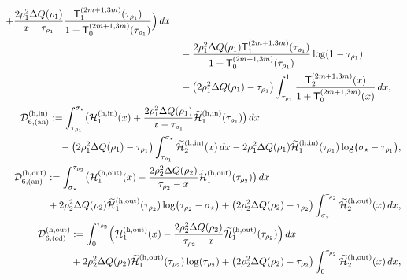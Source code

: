 \documentclass[a4paper]{article}
\numberwithin{equation}{section}
\begin{document}
\begin{align}
\begin{split}
+\frac{2\rho_1^2\Delta Q(\rho_1)}{x-\tau_{\rho_1}}\frac{\mathsf{T}_{1}^{(2m+1,3m)}(\tau_{\rho_1})}{1+\mathsf{T}_{0}^{(2m+1,3m)}(\tau_{\rho_1})}\Bigr)\,dx
\\
&\quad 
-
\frac{2\rho_1^2\Delta Q(\rho_1)\mathsf{T}_{1}^{(2m+1,3m)}(\tau_{\rho_1})}{1+\mathsf{T}_{0}^{(2m+1,3m)}(\tau_{\rho_1})}\log(1-\tau_{\rho_1})
\\
&\quad
-
\bigl(2\rho_1^2\Delta Q(\rho_1)-\tau_{\rho_1}\bigr)
\int_{\tau_{\rho_1}}^{1}
\frac{\mathsf{T}_{2}^{(2m+1,3m)}(x)}{1+\mathsf{T}_{0}^{(2m+1,3m)}(x)}\,dx,
\end{split}
\\
\begin{split}
\mathcal{D}_{6,(\mathrm{an})}^{(\mathrm{h,in})}
&:=
\int_{\tau_{\rho_1}}^{\sigma_{\star}}
\bigl(
\mathcal{H}_1^{(\mathrm{h,in})}(x)
+
\frac{2\rho_1^2\Delta Q(\rho_1)}{x-\tau_{\rho_1}}
\widetilde{\mathcal{H}}_{1}^{(\mathrm{h,in})}(\tau_{\rho_1})
\bigr)\,dx
\\
&\quad
-\bigl(2\rho_1^2\Delta Q(\rho_1)-\tau_{\rho_1}\bigr)
\int_{\tau_{\rho_1}}^{\sigma_{\star}}
\widetilde{\mathcal{H}}_{2}^{(\mathrm{h,in})}(x)\,dx
-
2\rho_1^2\Delta Q(\rho_1)
\widetilde{\mathcal{H}}_{1}^{(\mathrm{h,in})}(\tau_{\rho_1})
\log\bigl(\sigma_{\star}-\tau_{\rho_1}\bigr), 
\end{split}
\\
\begin{split}
\mathcal{D}_{6,(\mathrm{an})}^{(\mathrm{h,out})}
&:=
\int_{\sigma_{\star}}^{\tau_{\rho_2}}
\bigl(
\mathcal{H}_1^{(\mathrm{h,out})}(x)
-
\frac{2\rho_2^2\Delta Q(\rho_2)}{\tau_{\rho_2}-x}
\widetilde{\mathcal{H}}_{1}^{(\mathrm{h,out})}(\tau_{\rho_2})
\bigr)\,dx
\\
&
+
2\rho_2^2\Delta Q(\rho_2)
\widetilde{\mathcal{H}}_{1}^{(\mathrm{h,out})}(\tau_{\rho_2})
\log\bigl(\tau_{\rho_2}-\sigma_{\star}\bigr)
+\bigl( 
2\rho_2^2\Delta Q(\rho_2)-\tau_{\rho_2}
\bigr)\int_{\sigma_{\star}}^{\tau_{\rho_2}}
\widetilde{\mathcal{H}}_{2}^{(\mathrm{h,out})}(x)\,dx, 
\end{split}
\\
\begin{split}
\mathcal{D}_{6,(\mathrm{cd})}^{(\mathrm{h,out})}
&:=
\int_{0}^{\tau_{\rho_2}}
\Bigl(\mathcal{H}_1^{(\mathrm{h,out})}(x)-\frac{2\rho_2^2\Delta Q(\rho_2)}{\tau_{\rho_2}-x}\widetilde{\mathcal{H}}_1^{(\mathrm{h,out})}(\tau_{\rho_2})\Bigr)\,dx
\\
&
+2\rho_2^2\Delta Q(\rho_2)\widetilde{\mathcal{H}}_1^{(\mathrm{h,out})}(\tau_{\rho_2})\log(\tau_{\rho_2})+\bigl( 2\rho_2^2\Delta Q(\rho_2)-\tau_{\rho_2}\bigr)\int_{0}^{\tau_{\rho_2}}\widetilde{\mathcal{H}}_2^{(\mathrm{h,out})}(x)\,dx, 

\end{split}
\end{align}
\end{document}
